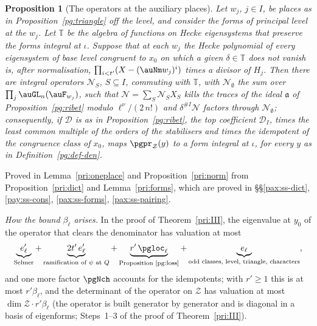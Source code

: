 \documentclass[10pt]{amsart}
\newtheorem{proposition}[theorem]{Proposition}
\theoremstyle{definition}
\theoremstyle{remark}
\begin{document}
\begin{proposition}[The operators at the auxiliary places]\label{pg:norm}
Let $w_j$, $j\in I$, be places as in Proposition~\ref{pg:triangle} off the level, and consider
the forms of principal level at the $w_j$. Let $\mathbb T$ be the algebra of functions on Hecke
eigensystems that preserve the forms integral at $\iota$. Suppose that at each $w_j$ the Hecke
polynomial of every eigensystem of base level congruent to $x_0$ on which a given $\delta\in
\mathbb T$ does not vanish is, after normalisation, $\prod_{i<t'}(X-(\auNm w_j)^i)$ times a divisor
of $H_j$. Then there are integral operators $\mathcal N_S$, $S\subseteq I$, commuting with
$\mathbb T$, with $\mathcal N_\emptyset$ the sum over $\prod_j\auGL_n(\auF_{w_j})$, such that
$\mathcal N=\sum_S\mathcal N_SX_S$ kills the traces of the ideal $\mathfrak a$ of
Proposition~\ref{pg:ribet} modulo $\ell^\nu/(2\,n!)$ and $\delta^{\#I}\mathcal N$ factors through
$\mathcal N_\emptyset$; consequently, if $\mathcal D$ is as in Proposition~\ref{pg:ribet}, the top
coefficient $\mathcal D_I$, times the least common multiple of the orders of the stabilisers and
times the idempotent of the congruence class of $x_0$, maps $\pgpr_{\mathcal Z}(y)$ to a form
integral at $\iota$, for every $y$ as in Definition~\ref{pg:def-den}.
\end{proposition}
\smallskip\noindent Proved in Lemma~\ref{pri:oneplace} and Proposition~\ref{pri:norm} from
Proposition~\ref{pri:dict} and Lemma~\ref{pri:forms}, which are proved in \S\S\ref{pax:ss-dict},
\ref{pay:ss-cons}, \ref{pax:ss-forms}, \ref{pax:ss-pairing}.\par\smallskip

\emph{How the bound $\beta_\ell$ arises.} In the proof of Theorem~\ref{pri:III}, the eigenvalue at
$y_0$ of the operator
that clears the denominator has valuation at most
\[
\underbrace{e'_\ell}_{\text{Selmer}}+\underbrace{2t'\,e'_\ell}_{\text{ramification of }\psi
\text{ at }Q}+\underbrace{r'\,\pgloc_\ell}_{\text{Proposition \ref{pg:loss}}}+\underbrace{e_\ell}_{
\text{odd classes, level, triangle, characters}},
\]
and one more factor $\pgNch$ accounts for the idempotents; with $r'\ge1$ this is at most
$r'\beta_\ell$, and the determinant of the operator on $\mathcal Z$ has valuation at most
$\dim\mathcal Z\cdot r'\beta_\ell$ (the operator is built generator by generator and is diagonal
in a basis of eigenforms; Steps~1--3 of the proof of Theorem~\ref{pri:III}).
\end{document}

